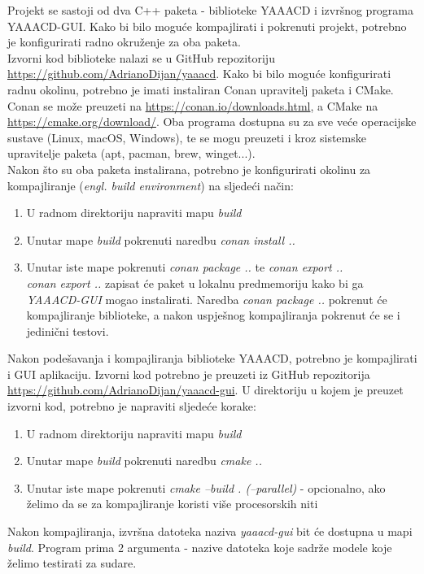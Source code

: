 Projekt se sastoji od dva C++ paketa - biblioteke YAAACD i izvršnog programa YAAACD-GUI. Kako bi bilo moguće
kompajlirati i pokrenuti projekt, potrebno je konfigurirati radno okruženje za oba paketa.\\

Izvorni kod biblioteke nalazi se u GitHub repozitoriju \url{https://github.com/AdrianoDijan/yaaacd}.
Kako bi bilo moguće konfigurirati radnu okolinu, potrebno je imati instaliran Conan upravitelj paketa i CMake.
Conan se može preuzeti na \url{https://conan.io/downloads.html}, a CMake na \url{https://cmake.org/download/}.
Oba programa dostupna su za sve veće operacijske sustave (Linux, macOS, Windows), te se mogu preuzeti
i kroz sistemske upravitelje paketa (apt, pacman, brew, winget...).\\

Nakon što su oba paketa instalirana, potrebno je konfigurirati okolinu
za kompajliranje (\textit{engl. build environment}) na sljedeći način:

\begin{enumerate}
  \item U radnom direktoriju napraviti mapu \textit{build}
  \item Unutar mape \textit{build} pokrenuti naredbu \textit{conan install ..}
  \item Unutar iste mape pokrenuti \textit{conan package ..} te \textit{conan export ..}\\
      \textit{conan export ..} zapisat će paket u lokalnu predmemoriju kako bi ga \textit{YAAACD-GUI} mogao instalirati.
      Naredba \textit{conan package ..} pokrenut će kompajliranje biblioteke, a nakon uspješnog kompajliranja pokrenut će
      se i jedinični testovi.
\end{enumerate}

Nakon podešavanja i kompajliranja biblioteke YAAACD, potrebno je kompajlirati i GUI aplikaciju.
Izvorni kod potrebno je preuzeti iz GitHub repozitorija \url{https://github.com/AdrianoDijan/yaaacd-gui}.
U direktoriju u kojem je preuzet izvorni kod, potrebno je napraviti sljedeće korake:

\begin{enumerate}
  \item U radnom direktoriju napraviti mapu \textit{build}
  \item Unutar mape \textit{build} pokrenuti naredbu \textit{cmake ..}
  \item Unutar iste mape pokrenuti \textit{cmake --build . (--parallel)} - opcionalno, ako 
    želimo da se za kompajliranje koristi više procesorskih niti
\end{enumerate}

Nakon kompajliranja, izvršna datoteka naziva \textit{yaaacd-gui} bit će dostupna u mapi \textit{build}.
Program prima 2 argumenta - nazive datoteka koje sadrže modele koje želimo testirati za sudare.
